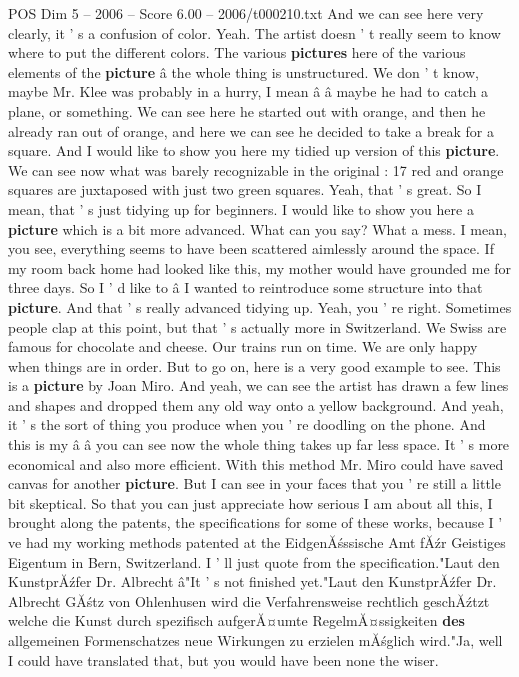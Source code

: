 \begin{textsample}{POS Dim 5 – 2006 – Score 6.00 – 2006/t000210.txt}
And we can see here very clearly, it ' s a confusion of color.
Yeah.
The artist doesn ' t really seem to know where to put the different colors.
The various \textbf{pictures} here of the various elements of the \textbf{picture} â the whole thing is unstructured.
We don ' t know, maybe Mr.
Klee was probably in a hurry, I mean â â maybe he had to catch a plane, or something.
We can see here he started out with orange, and then he already ran out of orange, and here we can see he decided to take a break for a square.
And I would like to show you here my tidied up version of this \textbf{picture}.
We can see now what was barely recognizable in the original : 17 red and orange squares are juxtaposed with just two green squares.
Yeah, that ' s great.
So I mean, that ' s just tidying up for beginners.
I would like to show you here a \textbf{picture} which is a bit more advanced.
What can you say?
What a mess.
I mean, you see, everything seems to have been scattered aimlessly around the space.
If my room back home had looked like this, my mother would have grounded me for three days.
So I ' d like to â I wanted to reintroduce some structure into that \textbf{picture}.
And that ' s really advanced tidying up.
Yeah, you ' re right.
Sometimes people clap at this point, but that ' s actually more in Switzerland.
We Swiss are famous for chocolate and cheese.
Our trains run on time.
We are only happy when things are in order.
But to go on, here is a very good example to see.
This is a \textbf{picture} by Joan Miro.
And yeah, we can see the artist has drawn a few lines and shapes and dropped them any old way onto a yellow background.
And yeah, it ' s the sort of thing you produce when you ' re doodling on the phone.
And this is my â â you can see now the whole thing takes up far less space.
It ' s more economical and also more efficient.
With this method Mr.
Miro could have saved canvas for another \textbf{picture}.
But I can see in your faces that you ' re still a little bit skeptical.
So that you can just appreciate how serious I am about all this, I brought along the patents, the specifications for some of these works, because I ' ve had my working methods patented at the EidgenĂśssische Amt fĂźr Geistiges Eigentum in Bern, Switzerland.
I ' ll just quote from the specification."Laut den KunstprĂźfer Dr.
Albrecht â"It ' s not finished yet."Laut den KunstprĂźfer Dr.
Albrecht GĂśtz von Ohlenhusen wird die Verfahrensweise rechtlich geschĂźtzt welche die Kunst durch spezifisch aufgerĂ¤umte RegelmĂ¤ssigkeiten \textbf{des} allgemeinen Formenschatzes neue Wirkungen zu erzielen mĂśglich wird."Ja, well I could have translated that, but you would have been none the wiser.

\end{textsample}
